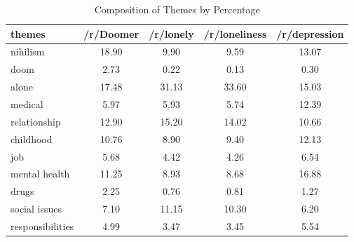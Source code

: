 \documentclass[../report.tex]{subfiles}
\begin{document}
\begin{table*}[ht]
		\centering
		\begin{tabular}{| l | c | c | c | c |}
			\toprule
			themes & /r/Doomer & /r/lonely & /r/loneliness & /r/depression \\
			\midrule
\multicolumn{1}{|p{4cm}|}{nihilism} & 18.90 & 9.90 & 9.59 & 13.07 \\
\multicolumn{1}{|p{4cm}|}{doom} & 2.73 & 0.22 & 0.13 & 0.30 \\
\multicolumn{1}{|p{4cm}|}{alone} & 17.48 & 31.13 & 33.60 & 15.03 \\
\multicolumn{1}{|p{4cm}|}{medical} & 5.97 & 5.93 & 5.74 & 12.39 \\
\multicolumn{1}{|p{4cm}|}{relationship} & 12.90 & 15.20 & 14.02 & 10.66 \\
\multicolumn{1}{|p{4cm}|}{childhood} & 10.76 & 8.90 & 9.40 & 12.13 \\
\multicolumn{1}{|p{4cm}|}{job} & 5.68 & 4.42 & 4.26 & 6.54 \\
\multicolumn{1}{|p{4cm}|}{mental health} & 11.25 & 8.93 & 8.68 & 16.88 \\
\multicolumn{1}{|p{4cm}|}{drugs} & 2.25 & 0.76 & 0.81 & 1.27 \\
\multicolumn{1}{|p{4cm}|}{social issues} & 7.10 & 11.15 & 10.30 & 6.20 \\
\multicolumn{1}{|p{4cm}|}{responsibilities} & 4.99 & 3.47 & 3.45 & 5.54 \\
			\bottomrule
		\end{tabular}
		\caption{Composition of Themes by Percentage}
		\label{tab:composition}
\end{table*}
\end{document}
